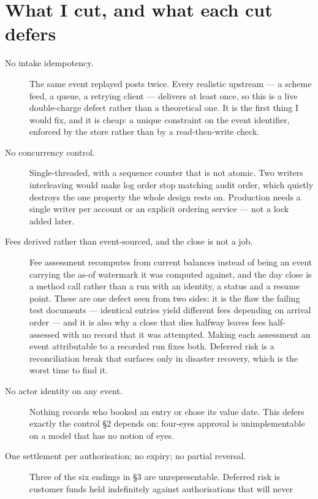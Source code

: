 \documentclass[10pt,a4paper]{article}
\begin{document}
\section{What I cut, and what each cut defers}

\begin{description}
  \item[No intake idempotency.] The same event replayed posts twice. Every
        realistic upstream --- a scheme feed, a queue, a retrying client ---
        delivers at least once, so this is a live double-charge defect rather
        than a theoretical one. It is the first thing I would fix, and it is
        cheap: a unique constraint on the event identifier, enforced by the
        store rather than by a read-then-write check.
  \item[No concurrency control.] Single-threaded, with a sequence counter that
        is not atomic. Two writers interleaving would make log order stop
        matching audit order, which quietly destroys the one property the whole
        design rests on. Production needs a single writer per account or an
        explicit ordering service --- not a lock added later.
  \item[Fees derived rather than event-sourced, and the close is not a job.]
        Fee assessment recomputes from current balances instead of being an
        event carrying the as-of watermark it was computed against, and the
        day close is a method call rather than a run with an identity, a
        status and a resume point. These are one defect seen from two sides:
        it is the flaw the failing test documents --- identical entries yield
        different fees depending on arrival order --- and it is also why a
        close that dies halfway leaves fees half-assessed with no record that
        it was attempted. Making each assessment an event attributable to a
        recorded run fixes both. Deferred risk is a reconciliation break that
        surfaces only in disaster recovery, which is the worst time to find
        it.
  \item[No actor identity on any event.] Nothing records who booked an entry or
        chose its value date. This defers exactly the control \S2 depends on:
        four-eyes approval is unimplementable on a model that has no notion of
        eyes.
  \item[One settlement per authorisation; no expiry; no partial reversal.]
        Three of the six endings in \S3 are unrepresentable. Deferred risk is
        customer funds held indefinitely against authorisations that will never

\end{description}
\end{document}
